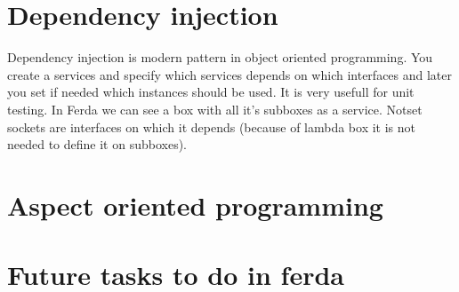 \documentclass{article}
\begin{document}
\section{Dependency injection}
Dependency injection is modern pattern in object oriented programming. You create a services and specify which services depends on which interfaces and later you set if needed which instances should be used. It is very usefull for unit testing. In Ferda we can see a box with all it's subboxes as a service. Notset sockets are interfaces on which it depends (because of lambda box it is not needed to define it on subboxes).

\section{Aspect oriented programming}
\section{Future tasks to do in ferda}


\end{document}
